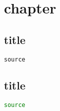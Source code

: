 
\chapter{chapter}
\section{title}
\begin{lstlisting}[language=C,style=CStyle,style=numbers]
source
\end{lstlisting}

\section{title}
\begin{lstlisting}[language=bash,style=nonumbers]
source
\end{lstlisting}
